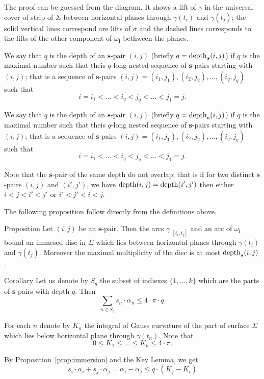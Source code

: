 \documentclass[a4paper,10pt]{amsart}
\begin{document}
The proof can be guessed from the diagram.
It shows a lift of $\gamma$ in the universal cover of strip of $\Sigma$ between horizontal planes through $\gamma(t_i)$ and $\gamma(t_j)$;
the solid vertical lines correspond are lifts of $\sigma$ and the dashed lines corresponds to the lifts of the other component of $\omega_{\bm{i}}$ bethween the planes.

We say that $q$ is the depth of an $\bm{s}$-pair $(i,j)$
(briefly $q=\mathop{\rm depth}\nolimits_{\bm{s}}(i,j)$) 
if $q$ is the maximal number such that theis $q$-long nested sequence of $\bm{s}$-pairs starting with $(i,j)$; 
that is a sequence of $\bm{s}$-pairs
$(i,j)=(i_1,j_1),(i_2,j_2),\dots,(i_q,j_q)$ such that
\[i=i_1<\dots<i_q<j_q<\dots<j_1=j.\]

We say that $q$ is the depth of an $\bm{s}$-pair $(i,j)$
(briefly $q=\mathop{\rm depth}\nolimits_{\bm{s}}(i,j)$) 
if $q$ is the maximal number such that theis $q$-long nested sequence of $\bm{s}$-pairs starting with $(i,j)$; 
that is a sequence of $\bm{s}$-pairs
$(i,j)=(i_1,j_1),(i_2,j_2),\dots,(i_q,j_q)$ such that
\[i=i_1<\dots<i_q<j_q<\dots<j_1=j.\]

Note that the $\bm{s}$-pair of the same depth do not overlap;
that is if for two distinct $\bm{s}$-pairs $(i,j)$ and $(i',j')$,
we have $\mathop{\rm depth}\nolimits(i,j)=\mathop{\rm depth}\nolimits(i',j')$
then either $i<j<i'<j'$ or $i'<j'<i<j$.

The following proposition follow directly from the definitions above.

\begin{thm}{Proposition}\label{prop:immersion}
Let $(i,j)$ be an $\bm{s}$-pair.
Then the arcs $\gamma|_{[t_i,t_j]}$ and an arc of $\omega_{\bm{i}}$ bound an immesed disc in $\Sigma$ which lies between horizontal planes through $\gamma(t_i)$ and $\gamma(t_j)$.
Moreover the maximal multiplicity of the disc is at most $\mathop{\rm depth}\nolimits_{\bm{s}}(i,j)$.
\end{thm}


\begin{thm}{Corollary}\label{cor:Sq}
Let us denote by $S_q$  the subset of indiexes $\{1,\dots,k\}$
which are the parts of $\bm{s}$-pairs with depth $q$.
Then
\[\sum_{n\in S_q}s_n\cdot\alpha_n\le 4\cdot\pi\cdot q.\]
\end{thm}

 For each $n$ denote by $K_n$ the integral of Gauss curvature of the part of surface $\Sigma$ which lies below horizontal plane through $\gamma(t_n)$.
Note that 
\[0\le K_1\le\dots\le K_k\le 4\cdot\pi.\]


By Proposition~\ref{prop:immersion} and the Key Lemma,
we get
\[s_i\cdot\alpha_i+s_j\cdot\alpha_j=\alpha_i-\alpha_j\le q\cdot (K_j-K_i)\]
\end{document}
